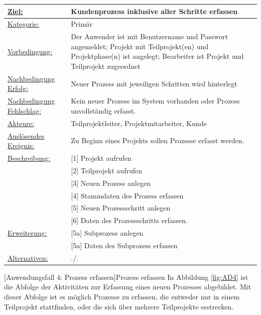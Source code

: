 \begin{tabularx}{\textwidth}{|p{}|p{}|}
        \hline
        \underline{Ziel:} & Kundenprozess inklusive aller Schritte erfassen \\\hline
        \underline{Kategorie:} & Primär\\\hline
        \underline{Vorbedingung:} & Der Anwender ist mit Benutzername und Passwort angemeldet; Projekt mit Teilprojekt(en) und Projektphase(n) ist angelegt; Bearbeiter ist Projekt und Teilprojekt zugeordnet\\\hline
        \underline{Nachbedingung Erfolg:} & Neuer Prozess mit jeweiligen Schritten wird hinterlegt \\\hline
        \underline{Nachbedingung Fehlschlag:} & Kein neuer Prozess im System vorhanden oder Prozess unvollständig erfasst. \\\hline
        \underline{Akteure:} & Teilprojektleiter, Projektmitarbeiter, Kunde\\\hline
        \underline{Auslösendes Ereignis:} & Zu Beginn eines Projekts sollen Prozesse erfasst werden.\\\hline        
        \multirow{1}{*}{\underline{Beschreibung:}} & [1] Projekt aufrufen\\
        & [2] Teilprojekt aufrufen\\
        & [3] Neuen Prozess anlegen\\
        & [4] Stammdaten des Prozess erfassen\\
        & [5] Neuen Prozessschritt anlegen\\
        & [6] Daten des Prozessschritts erfassen.\\\hline
        \multirow{1}{*}{\underline{Erweiterung:}} & [5a] Subprozess anlegen\\
        & [5a] Daten des Subprozess erfassen\\\hline
        \underline{Alternativen:} & ./. \\\hline
\end{tabularx}
[Anwendungsfall 4: Prozess erfassen]{Prozess erfassen}
\newpage
In Abbildung \ref{fig:AD4} ist die Abfolge der Aktivitäten zur Erfassung eines neuen Prozesses abgebildet. Mit dieser Abfolge ist es möglich Prozesse zu erfassen, die entweder nur in einem Teilprojekt stattfinden, oder die sich über mehrere Teilprojekte erstrecken. 
